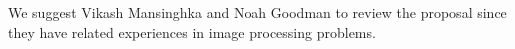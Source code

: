 We suggest Vikash Mansinghka and Noah Goodman to review the proposal since they have related experiences in image processing problems. 